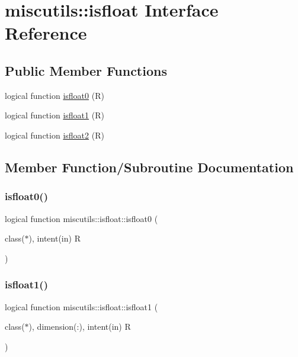 \hypertarget{interfacemiscutils_1_1isfloat}{}\section{miscutils\+:\+:isfloat Interface Reference}
\label{interfacemiscutils_1_1isfloat}
\subsection*{Public Member Functions}
\begin{DoxyCompactItemize}
\item 
logical function \mbox{\hyperlink{interfacemiscutils_1_1isfloat_ab1a9439e4a30d8e99a36192e870fc402}{isfloat0}} (R)
\item 
logical function \mbox{\hyperlink{interfacemiscutils_1_1isfloat_a38fd8b0e693ccbee6718f608c72b3df3}{isfloat1}} (R)
\item 
logical function \mbox{\hyperlink{interfacemiscutils_1_1isfloat_a5a81a1df18f642eb86845fe1715c59eb}{isfloat2}} (R)
\end{DoxyCompactItemize}


\subsection{Member Function/\+Subroutine Documentation}
\mbox{\label{interfacemiscutils_1_1isfloat_ab1a9439e4a30d8e99a36192e870fc402}} 
\subsubsection{\texorpdfstring{isfloat0()}{isfloat0()}}
{\footnotesize\ttfamily logical function miscutils\+::isfloat\+::isfloat0 (\begin{DoxyParamCaption}\item[{class($\ast$), intent(in)}]{R }\end{DoxyParamCaption})}

\mbox{\label{interfacemiscutils_1_1isfloat_a38fd8b0e693ccbee6718f608c72b3df3}} 
\subsubsection{\texorpdfstring{isfloat1()}{isfloat1()}}
{\footnotesize\ttfamily logical function miscutils\+::isfloat\+::isfloat1 (\begin{DoxyParamCaption}\item[{class($\ast$), dimension(\+:), intent(in)}]{R }\end{DoxyParamCaption})}

